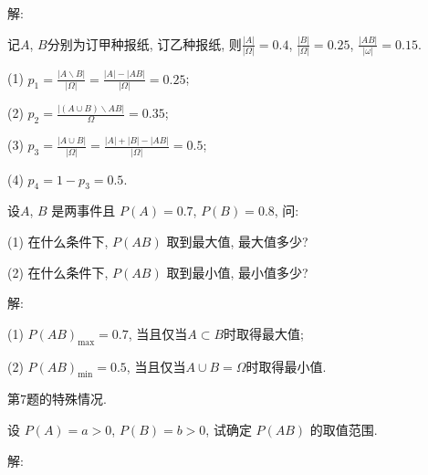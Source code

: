 \documentclass[standard]{ExBook}
\begin{document}
\begin{qitems}
\vspace{-5em}

    \begin{bbox}
解: 

记$A$, $B$分别为订甲种报纸, 订乙种报纸, 则$\frac{|A|}{|\Omega|}=0.4$, $\frac{|B|}{|\Omega|}=0.25$, $\frac{|AB|}{|\omega|}=0.15$.

(1) $p_{1}=\frac{|A\backslash B|}{|\Omega|}=\frac{|A|-|AB|}{|\Omega|}=0.25$;

(2) $p_{2}=\frac{|(A\cup B)\backslash AB|}{\Omega}=0.35$;

(3) $p_{3}=\frac{|A\cup B|}{|\Omega|}=\frac{|A|+|B|-|AB|}{|\Omega|}=0.5$;

(4) $p_{4}=1-p_{3}=0.5$.
    \end{bbox}

\vspace{-5em}

    \begin{bbox}
    \begin{shaded}
        \qitem
设$A$, $B$ 是两事件且 $P(A) = 0.7$, $P(B) = 0.8$, 问: 

(1) 在什么条件下, $P(AB)$ 取到最大值, 最大值多少? 

(2) 在什么条件下, $P(AB)$ 取到最小值, 最小值多少?
    \end{shaded}
    \end{bbox}

\vspace{-5em}

    \begin{bbox}
解:

(1) $P(AB)_{\max}=0.7$, 当且仅当$A\subset B$时取得最大值;

(2) $P(AB)_{\min}=0.5$, 当且仅当$A\cup B=\Omega$时取得最小值.

\textcolor{themeColor}{\selectfont {} 第7题的特殊情况.}
    \end{bbox}

\vspace{-5em}

    \begin{bbox}
    \begin{shaded}
        \qitem
设 $P(A) = a > 0$, $P(B) = b > 0$, 试确定 $P(AB)$ 的取值范围.
    \end{shaded}
    \end{bbox}

\vspace{-5em}

    \begin{bbox}
解:


\end{bbox}
\end{qitems}
\end{document}
